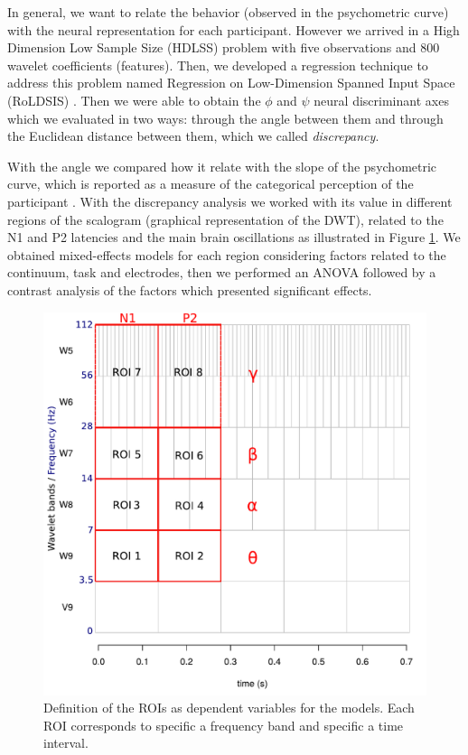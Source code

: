 In general, we want to relate the behavior (observed in the psychometric curve)
with the neural representation for each participant. However we arrived in a
High Dimension Low Sample Size (HDLSS) problem with five observations and $800$
wavelet coefficients (features). Then, we developed a regression technique to
address this problem named Regression on Low-Dimension Spanned Input Space
(RoLDSIS) \citep{santana2020bmc}. Then we were able to obtain the $\phi$ and
$\psi$ neural discriminant axes which we evaluated in two ways: through the
angle between them and through the Euclidean distance between them, which we
called \emph{discrepancy}.


With the angle we compared how it relate with the slope of the psychometric
curve, which is reported as a measure of the categorical perception of the
participant \citep{bidelman2017}. With the discrepancy analysis we worked with
its value in different regions of the scalogram (graphical representation of
the DWT), related to the N1 and P2 latencies and the main brain oscillations as
illustrated in Figure \ref{ROIs}. We obtained mixed-effects models for each
region considering factors related to the continuum, task and electrodes, then
we performed an ANOVA followed by a contrast analysis of the factors which
presented significant effects.

\begin{figure}
\centering
\includegraphics[width=\linewidth]{imgs/ROIs.pdf}
\caption{Definition of the ROIs as dependent variables for the models. Each ROI
corresponds to specific a frequency band and specific a time interval.}
\label{ROIs}
\end{figure}




